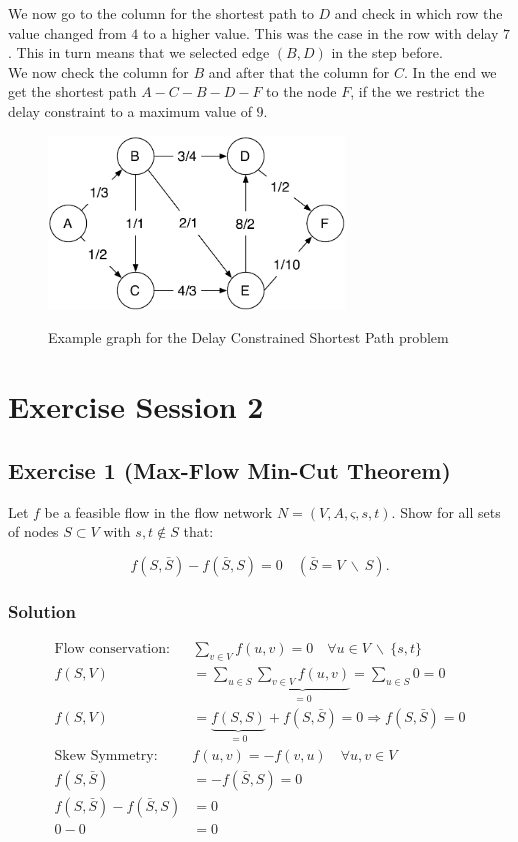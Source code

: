 \documentclass[a4paper, 12pt]{report}
\begin{document}
We now go to the column for the shortest path to $D$ and check in which row the
value changed from $4$ to a higher value. This was the case in the row with
delay $7$. This in turn means that we selected edge $(B,D)$ in the step
before.\\

We now check the column for $B$ and after that the column for $C$. In the end
we get the shortest path $A-C-B-D-F$ to the node $F$, if the we restrict the
delay constraint to a maximum value of $9$.

\begin{figure}[htbp]
    \caption{Example graph for the Delay Constrained Shortest Path problem}
    \vskip 0.2cm
    \centering
    \includegraphics[width=0.7\textwidth]{Figures/Delay_Shortest_Path}
    \label{figure:Delay_Shortest_Path}
\end{figure}

\chapter{Exercise Session 2}

\section{Exercise 1 (Max-Flow Min-Cut Theorem)}

Let $f$ be a feasible flow in the flow network $N = (V,A,ς,s,t)$. Show for all
sets of nodes $S ⊂ V$ with $s,t ∉ S$ that:

\[
    f(S, \bar{S}) − f(\bar{S}, S) = 0 \quad (\bar{S} = V ~\backslash~ S).
\]

\subsection{Solution}

\begin{align*}
    \text{Flow conservation: } &
    ∑_{v ∈ V} f(u,v) = 0 \quad ∀ u ∈ V ~\backslash~ \{s, t\}\\
    f(S,V) &=
        ∑_{u ∈ S} \underbrace{∑_{v ∈ V} f(u, v)}_{=0} = ∑_{u ∈ S} 0 = 0 \\
    f(S, V) &=
        \underbrace{f(S,S)}_{=0} + f(S, \bar{S}) = 0 ⇒ f(S,\bar{S}) = 0 \\[5pt]
    \text{Skew Symmetry: }& f(u,v) = - f(v,u) \quad ∀ u,v ∈ V\\[2pt]
    f(S, \bar{S}) &= - f(\bar{S}, S) = 0 \\
    f(S, \bar{S}) − f(\bar{S}, S) &= 0   \\
    0 - 0 &= 0
\end{align*}
\end{document}
